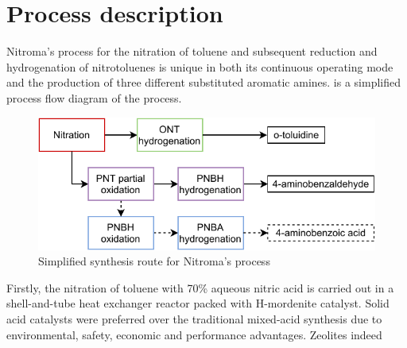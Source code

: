 \section{Process description}

Nitroma's process for the nitration of toluene and subsequent reduction and hydrogenation of nitrotoluenes is unique in both its continuous operating mode and the production of three different substituted aromatic amines.   is a simplified process flow diagram of the process.
\begin{figure}
    \centering
    \includegraphics{chapters/0-executive-summary/figures/BFD_nitroma-Page-3.pdf}
    \caption{Simplified synthesis route for Nitroma's process}
    \label{fig:BFD-ES}
\end{figure}
Firstly, the nitration of toluene with 70\% aqueous nitric acid is carried out in a shell-and-tube heat exchanger reactor packed with H-mordenite catalyst. Solid acid catalysts were preferred over the traditional mixed-acid synthesis due to environmental, safety, economic and performance advantages. Zeolites indeed 






